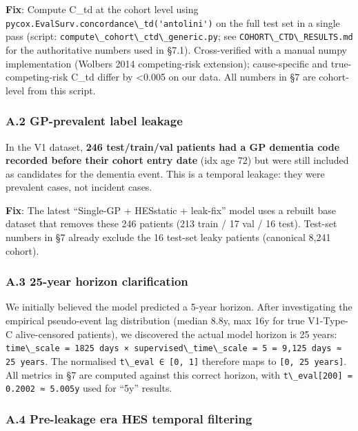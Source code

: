 \documentclass[
  11pt,
]{article}
\newcommand{\passthrough}[1]{#1}
\begin{document}
\textbf{Fix}: Compute C\_td at the cohort level using
\passthrough{\lstinline!pycox.EvalSurv.concordance\_td('antolini')!} on
the full test set in a single pass (script:
\passthrough{\lstinline!compute\_cohort\_ctd\_generic.py!}; see
\passthrough{\lstinline!COHORT\_CTD\_RESULTS.md!} for the authoritative
numbers used in §7.1). Cross-verified with a manual numpy implementation
(Wolbers 2014 competing-risk extension); cause-specific and
true-competing-risk C\_td differ by \textless0.005 on our data. All
numbers in §7 are cohort-level from this script.

\subsubsection{A.2 GP-prevalent label
leakage}\label{a.2-gp-prevalent-label-leakage}

In the V1 dataset, \textbf{246 test/train/val patients had a GP dementia
code recorded before their cohort entry date} (idx age 72) but were
still included as candidates for the dementia event. This is a temporal
leakage: they were prevalent cases, not incident cases.

\textbf{Fix}: The latest ``Single-GP + HESstatic + leak-fix'' model uses
a rebuilt base dataset that removes these 246 patients (213 train / 17
val / 16 test). Test-set numbers in §7 already exclude the 16 test-set
leaky patients (canonical 8,241 cohort).

\subsubsection{A.3 25-year horizon
clarification}\label{a.3-25-year-horizon-clarification}

We initially believed the model predicted a 5-year horizon. After
investigating the empirical pseudo-event lag distribution (median 8.8y,
max 16y for true V1-Type-C alive-censored patients), we discovered the
actual model horizon is 25 years:
\passthrough{\lstinline!time\_scale = 1825 days × supervised\_time\_scale = 5 = 9,125 days ≈ 25 years!}.
The normalised \passthrough{\lstinline!t\_eval ∈ [0, 1]!} therefore maps
to \passthrough{\lstinline![0, 25 years]!}. All metrics in §7 are
computed against this correct horizon, with
\passthrough{\lstinline!t\_eval[200] = 0.2002 ≈ 5.005y!} used for ``5y''
results.

\subsubsection{A.4 Pre-leakage era HES temporal
filtering}\label{a.4-pre-leakage-era-hes-temporal-filtering}
\end{document}
